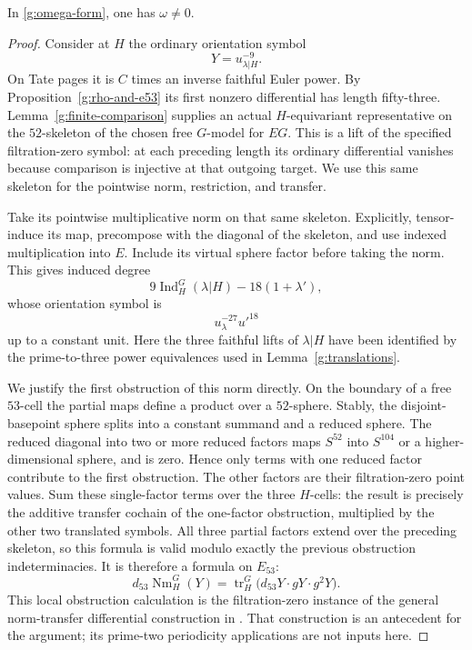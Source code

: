 \begin{lemma}\label{g:omega-norm}
In \eqref{g:omega-form}, one has $\omega\ne0$.
\end{lemma}

\begin{proof}
Consider at $H$ the ordinary orientation symbol
\[
 Y=u_{\lambda|H}^{-9}.
\]
On Tate pages it is $C$ times an inverse faithful
Euler power.  By Proposition~\ref{g:rho-and-e53} its
first nonzero differential has length fifty-three.
Lemma~\ref{g:finite-comparison} supplies an actual
$H$-equivariant representative on the $52$-skeleton
of the chosen free $G$-model for $EG$.
This is a lift of the specified filtration-zero symbol:
at each preceding length its ordinary differential
vanishes because comparison is injective at that
outgoing target.  We use this same skeleton for the
pointwise norm, restriction, and transfer.

Take its pointwise multiplicative norm on that same
skeleton.  Explicitly, tensor-induce its map, precompose
with the diagonal of the skeleton, and use indexed
multiplication into $E$.  Include its virtual sphere
factor before taking the norm.  This gives induced
degree
\[
 9\operatorname{Ind}_H^G(\lambda|H)
       -18(1+\lambda'),
\]
whose orientation symbol is
\[
 u_\lambda^{-27}u'^{18}
\]
up to a constant unit.  Here the three faithful lifts
of $\lambda|H$ have been identified by the prime-to-three
power equivalences used in Lemma~\ref{g:translations}.

We justify the first obstruction of this norm
directly.  On the boundary of a free $53$-cell the
partial maps define a product over a $52$-sphere.
Stably, the disjoint-basepoint sphere splits into a
constant summand and a reduced sphere.  The reduced
diagonal into two or more reduced factors maps
$S^{52}$ into $S^{104}$ or a higher-dimensional sphere,
and is zero.  Hence only terms with one reduced
factor contribute to the first obstruction.  The
other factors are their filtration-zero point values.
Sum these single-factor terms over the three
$H$-cells: the result is precisely the additive
transfer cochain of the one-factor obstruction,
multiplied by the other two translated symbols.
All three partial factors extend over the preceding
skeleton, so this formula is valid modulo exactly
the previous obstruction indeterminacies.  It is
therefore a formula on $E_{53}$:
\begin{equation}\label{g:norm-obstruction}
 d_{53}\operatorname{Nm}_H^G(Y)
 =\operatorname{tr}_H^G\bigl(d_{53}Y\cdot gY\cdot g^2Y\bigr).
\end{equation}
This local obstruction calculation is the filtration-zero
instance of the general norm-transfer differential
construction in \cite[Theorem~4.6 and
Proposition~5.4]{DHLLSWX}.  That construction is an
antecedent for the argument; its prime-two periodicity
applications are not inputs here.


\end{proof}
